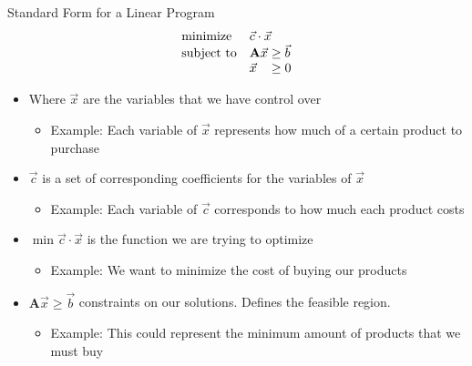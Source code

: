 \documentclass[
	11pt, %
]{beamer}
\begin{document}
\begin{frame}[label={sec:orgc3bccc9}]{Standard Form for a Linear Program}
\begin{align*}
  \begin{array}{ll@{}ll}
    \text{minimize}   & \vec{c} \cdot \vec{x}& \\
    \text{subject to} & \mathbf{A} \vec{x} &\geq  \vec{b} \\
                      & \vec{x} &\geq 0 \\
    \end{array}
\end{align*}
\pause
\begin{itemize}
\item Where \(\vec{x}\) are the variables that we have control over
\begin{itemize}
\item Example: Each variable of \(\vec{x}\) represents how much of a certain
product to purchase
\end{itemize}
\pause
\item \(\vec{c}\) is a set of corresponding coefficients for the variables of \(\vec{x}\)
\begin{itemize}
\item Example: Each variable of \(\vec{c}\) corresponds to how much each product costs
\end{itemize}
\pause
\item \(\min \vec{c} \cdot \vec{x}\) is the function we are trying to optimize
\begin{itemize}
\item Example: We want to minimize the cost of buying our products
\end{itemize}
\pause
\item \(\mathbf{A} \vec{x} \geq \vec{b}\) constraints on our solutions. Defines the
feasible region.
\begin{itemize}
\item Example: This could represent the minimum amount of products
that we must buy
\end{itemize}
\pause
\end{itemize}
\end{frame}
\end{document}
